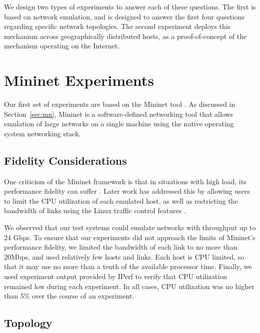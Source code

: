 \documentclass{cwru}
\begin{document}
We design two types of experiments to answer each of these questions. The first
is based on network emulation, and is designed to answer the first four
questions regarding specific network topologies. The second experiment deploys
this mechanism across geographically distributed hosts, as a proof-of-concept of
the mechanism operating on the Internet.

\section{Mininet Experiments}

Our first set of experiments are based on the Mininet tool \cite{mininet}. As
discussed in Section~\ref{sec:mn}, Mininet is a software-defined networking tool
that allows emulation of large networks on a single machine using the native
operating system networking stack.

\subsection{Fidelity Considerations}

One criticism of the Mininet framework is that in situations with high load, its
performance fidelity can suffer \cite{lantz2010network}. Later work has
addressed this by allowing users to limit the CPU utilization of each emulated
host, as well as restricting the bandwidth of links using the Linux traffic
control features \cite{handigol2012reproducible}.

We observed that our test systems could emulate networks with throughput up to
24 Gbps. To ensure that our experiments did not approach the limits of Mininet's
performance fidelity, we limited the bandwidth of each link to no more than
20Mbps, and used relatively few hosts and links. Each host is CPU limited, so
that it may use no more than a tenth of the available processor time. Finally,
we used experiment output provided by IPerf to verify that CPU utilization
remained low during each experiment. In all cases, CPU utilization was no higher
than 5\% over the course of an experiment.

\subsection{Topology}
\end{document}
